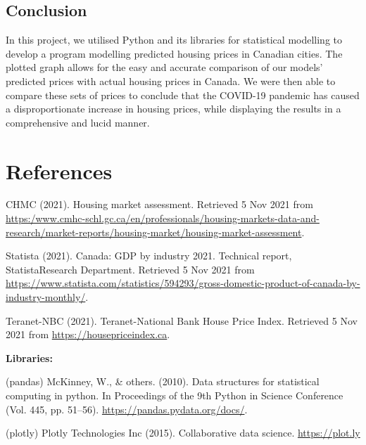 \documentclass{article}
\begin{document}
\subsection{Conclusion}

In this project, we utilised Python and its libraries for statistical modelling to develop a program modelling predicted housing prices in Canadian cities. The plotted graph allows for the easy and accurate comparison of our models' predicted prices with actual housing prices in Canada. We were then able to compare these sets of prices to conclude that the COVID-19 pandemic has caused a disproportionate increase in housing prices, while displaying the results in a comprehensive and lucid manner.


\section{References}

CHMC (2021). Housing market assessment. Retrieved 5 Nov 2021 from \url{https:/www.cmhc-schl.gc.ca/en/professionals/housing-markets-data-and-research/market-reports/housing-market/housing-market-assessment}.

Statista  (2021).   Canada:  GDP  by  industry  2021.   Technical  report,  StatistaResearch Department. Retrieved 5 Nov 2021 from \url{https://www.statista.com/statistics/594293/gross-domestic-product-of-canada-by-industry-monthly/}.

Teranet-NBC (2021).  Teranet-National Bank House Price Index.  Retrieved 5 Nov 2021 from \url{https://housepriceindex.ca}.


\textbf{Libraries:}

(pandas)
McKinney, W., \& others. (2010). Data structures for statistical computing in python. In Proceedings of the 9th Python in Science Conference (Vol. 445, pp. 51–56). \url{https://pandas.pydata.org/docs/}.

(plotly)
Plotly Technologies Inc (2015). Collaborative data science. \url{https://plot.ly}
\end{document}
